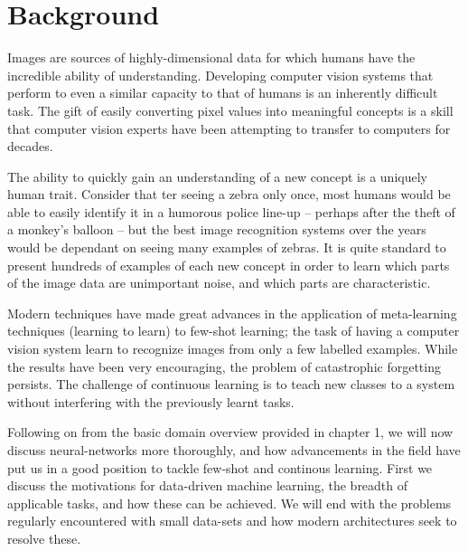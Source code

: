 \documentclass{report}
\begin{document}
	\chapter{Background}
	Images are sources of highly-dimensional data for which humans have the incredible ability of understanding. Developing computer vision systems that perform to even a similar capacity to that of humans is an inherently difficult task. The gift of easily converting pixel values into meaningful concepts is a skill that computer vision experts have been attempting to transfer to computers for decades. \par
	The ability to quickly gain an understanding of a new concept is a uniquely human trait. Consider that ter seeing a zebra only once, most humans would be able to easily identify it in a humorous police line-up  -- perhaps after the theft of a monkey's balloon --  but the best image recognition systems over the years would be dependant on seeing many examples of zebras. It is quite standard to present hundreds of examples of each new concept in order to learn which parts of the image data are unimportant noise, and which parts are characteristic. \par
	Modern techniques have made great advances in the application of meta-learning techniques (learning to learn) to few-shot learning; the task of having a computer vision system learn to recognize images from only a few labelled examples. While the results have been very encouraging, the problem of catastrophic forgetting persists. The challenge of continuous learning is to teach new classes to a system without interfering with the previously learnt tasks. \par
	Following on from the basic domain overview provided in chapter 1, we will now discuss neural-networks more thoroughly, and how advancements in the field have put us in a good position to tackle few-shot and continous learning. First we discuss the motivations for data-driven machine learning, the breadth of applicable tasks, and how these can be achieved. We will end with the problems regularly encountered with small data-sets and how modern architectures seek to resolve these. \par
	
\end{document}
